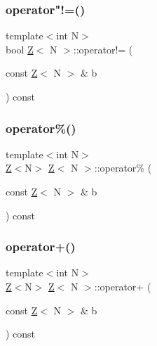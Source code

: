 \subsubsection{\texorpdfstring{operator"!=()}{operator!=()}}
{\footnotesize\ttfamily template$<$int N$>$ \\
bool \hyperlink{classZ}{Z}$<$ N $>$\+::operator!= (\begin{DoxyParamCaption}\item[{const \hyperlink{classZ}{Z}$<$ N $>$ \&}]{b }\end{DoxyParamCaption}) const\hspace{0.3cm}{\ttfamily [inline]}}

\mbox{\label{classZ_a4715a86eb00c00fce2be3d1c1bf24440}} 
\subsubsection{\texorpdfstring{operator\%()}{operator\%()}}
{\footnotesize\ttfamily template$<$int N$>$ \\
\hyperlink{classZ}{Z}$<$N$>$ \hyperlink{classZ}{Z}$<$ N $>$\+::operator\% (\begin{DoxyParamCaption}\item[{const \hyperlink{classZ}{Z}$<$ N $>$ \&}]{b }\end{DoxyParamCaption}) const\hspace{0.3cm}{\ttfamily [inline]}}

\mbox{\label{classZ_a1a01f7aaa064fe201c2e0cc72da02960}} 
\subsubsection{\texorpdfstring{operator+()}{operator+()}}
{\footnotesize\ttfamily template$<$int N$>$ \\
\hyperlink{classZ}{Z}$<$N$>$ \hyperlink{classZ}{Z}$<$ N $>$\+::operator+ (\begin{DoxyParamCaption}\item[{const \hyperlink{classZ}{Z}$<$ N $>$ \&}]{b }\end{DoxyParamCaption}) const\hspace{0.3cm}{\ttfamily [inline]}}

\mbox{\label{classZ_a3b61b86ccc14f54010c58e8ff2745d91}} 
